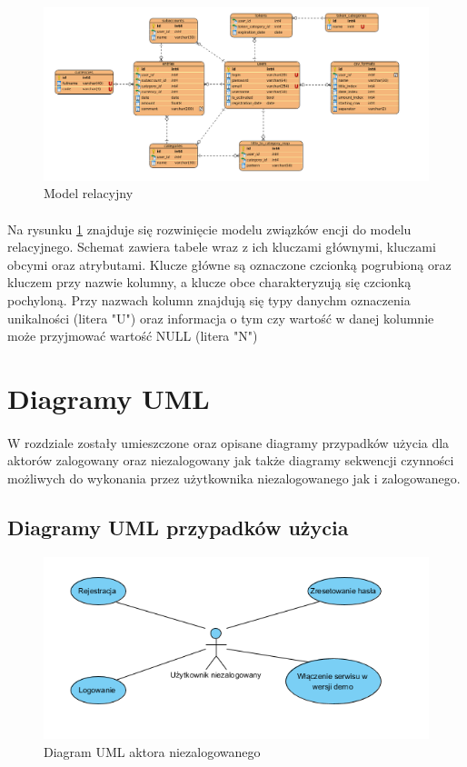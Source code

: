 \documentclass{article}
\begin{document}
	\begin{figure}[H]
		\centering
		\includegraphics[width=1\linewidth]{assets/rel.png}
		\caption[]{Model relacyjny}
		\label{fig:rel}
	\end{figure}

	\paragraph{} Na rysunku \ref{fig:rel} znajduje się rozwinięcie modelu związków encji do modelu relacyjnego. Schemat zawiera tabele wraz z ich kluczami głównymi, kluczami obcymi oraz atrybutami. Klucze główne są oznaczone czcionką pogrubioną oraz kluczem przy nazwie kolumny, a klucze obce charakteryzują się czcionką pochyloną. Przy nazwach kolumn znajdują się typy danychm oznaczenia unikalności (litera "U") oraz informacja o tym czy wartość w danej kolumnie może przyjmować wartość NULL (litera "N")

	\section{Diagramy UML}
	\paragraph*{} W rozdziale zostały umieszczone oraz opisane diagramy przypadków użycia dla aktorów zalogowany oraz niezalogowany jak także diagramy sekwencji czynności możliwych do wykonania przez użytkownika niezalogowanego jak i zalogowanego.
	\subsection{Diagramy UML przypadków użycia}
	\begin{figure}[h]
		\centering
		\includegraphics[scale=0.9]{assets/uml1.png}
		\caption[]{Diagram UML aktora niezalogowanego}
		\label{fig:niezalakt}
	\end{figure} 
\end{document}
